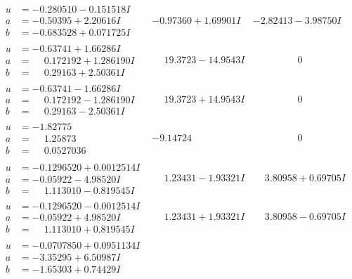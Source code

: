 \documentclass[1p]{elsarticle_modified}
\theoremstyle{definition}
\begin{document}
$$\begin{array}{c|c|c}
\begin{aligned}
u &= -0.280510 - 0.151518 I \\
a &= -0.50395 + 2.20616 I \\
b &= -0.683528 + 0.071725 I\end{aligned}
 & -0.97360 + 1.69901 I & -2.82413 - 3.98750 I \\ \hline\begin{aligned}
u &= -0.63741 + 1.66286 I \\
a &= \phantom{-}0.172192 + 1.286190 I \\
b &= \phantom{-}0.29163 + 2.50361 I\end{aligned}
 & \phantom{-}19.3723 - 14.9543 I & \phantom{-0.000000 } 0 \\ \hline\begin{aligned}
u &= -0.63741 - 1.66286 I \\
a &= \phantom{-}0.172192 - 1.286190 I \\
b &= \phantom{-}0.29163 - 2.50361 I\end{aligned}
 & \phantom{-}19.3723 + 14.9543 I & \phantom{-0.000000 } 0 \\ \hline\begin{aligned}
u &= -1.82775\phantom{ +0.000000I} \\
a &= \phantom{-}1.25873\phantom{ +0.000000I} \\
b &= \phantom{-}0.0527036\phantom{ +0.000000I}\end{aligned}
 & -9.14724\phantom{ +0.000000I} & \phantom{-0.000000 } 0 \\ \hline\begin{aligned}
u &= -0.1296520 + 0.0012514 I \\
a &= -0.05922 - 4.98520 I \\
b &= \phantom{-}1.113010 - 0.819545 I\end{aligned}
 & \phantom{-}1.23431 - 1.93321 I & \phantom{-}3.80958 + 0.69705 I \\ \hline\begin{aligned}
u &= -0.1296520 - 0.0012514 I \\
a &= -0.05922 + 4.98520 I \\
b &= \phantom{-}1.113010 + 0.819545 I\end{aligned}
 & \phantom{-}1.23431 + 1.93321 I & \phantom{-}3.80958 - 0.69705 I \\ \hline\begin{aligned}
u &= -0.0707850 + 0.0951134 I \\
a &= -3.35295 + 6.50987 I \\
b &= -1.65303 + 0.74429 I\end{aligned}

\end{array}$$
\end{document}
